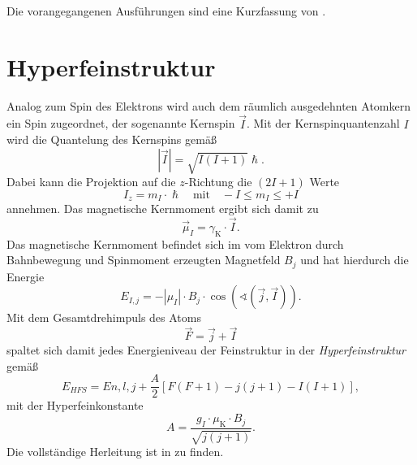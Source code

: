 \documentclass[../bericht.tex]{subfiles}
\begin{document}
      Die vorangegangenen Ausführungen sind eine Kurzfassung von \cite{dem:exp3-feinstruktur}.


    \section{Hyperfeinstruktur}
    \label{sec:hyperfeinstruktur}

      Analog zum Spin des Elektrons wird auch dem räumlich ausgedehnten Atomkern ein Spin zugeordnet, der sogenannte Kernspin $\vec{I}$. Mit der Kernspinquantenzahl $I$ wird die Quantelung des Kernspins gemä\ss
      \begin{equation*}
        |\vec{I}|=\sqrt{I(I+1)}\hslash.
      \end{equation*}
      Dabei kann die Projektion auf die $z$-Richtung die $(2I+1)$ Werte
      \begin{equation*}
        I_z=m_I\cdot \hslash \quad \text{mit}\quad -I\le m_I \le +I
      \end{equation*}
      annehmen. Das magnetische Kernmoment ergibt sich damit zu
      \begin{equation*}
        \vec{\mu}_I=\gamma_\mathrm{K}\cdot \vec{I}.
      \end{equation*}
      Das magnetische Kernmoment befindet sich im vom Elektron durch Bahnbewegung und Spinmoment erzeugten Magnetfeld $B_j$ und hat hierdurch die Energie
      \begin{equation*}
        E_{I,j}=-|\mu_I|\cdot B_j \cdot \cos \left( \sphericalangle \left( \vec{j}, \vec{I}\right) \right).
      \end{equation*}
      Mit dem Gesamtdrehimpuls des Atoms
      \begin{equation*}
        \vec{F} = \vec{j}+\vec{I}
      \end{equation*}
      spaltet sich damit jedes Energieniveau der Feinstruktur in der \textit{Hyperfeinstruktur} gemä\ss
      \begin{equation}
        E_{HFS}=E{n,l,j} + \frac{A}{2}\left[ F(F+1) - j(j+1) - I(I+1) \right],
      \end{equation}
      mit der Hyperfeinkonstante
      \begin{equation*}
        A=\frac{g_I \cdot \mu_\mathrm{K}\cdot B_j}{\sqrt{j(j+1)}}.
      \end{equation*}
      Die vollständige Herleitung ist in \cite{dem:exp3-hyperfeinstruktur} zu finden.
\end{document}
